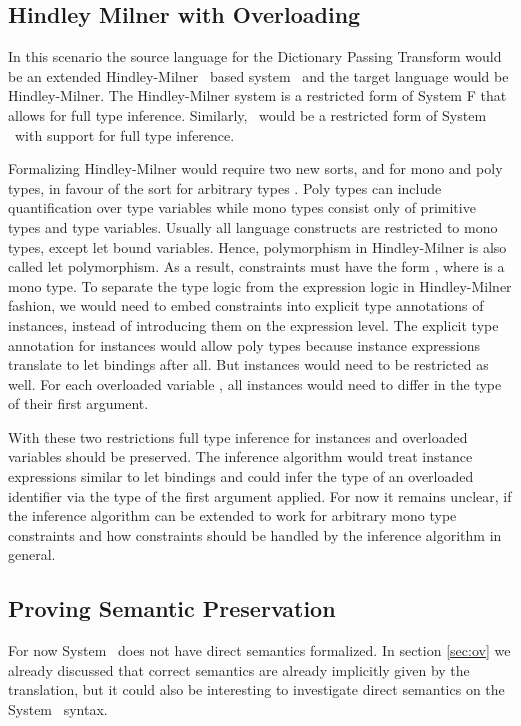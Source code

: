 \subsection{Hindley Milner with Overloading}\label{sec:hm}
In this scenario the source language for the Dictionary Passing Transform would be an extended Hindley-Milner~\cite{hm} based system \HMo\ and the target language would be Hindley-Milner. 
The Hindley-Milner system is a restricted form of System F that allows for full type inference. 
Similarly, \HMo\ would be a restricted form of System \Fo\ with support for full type inference. 

\noindent Formalizing Hindley-Milner would require two new sorts,  and  for mono and poly types, in favour of the sort for arbitrary types . 
Poly types can include quantification over type variables while mono types consist only of primitive types and type variables. 
Usually all language constructs are restricted to mono types, except let bound variables. 
Hence, polymorphism in Hindley-Milner is also called let polymorphism.  
As a result, constraints must have the form  \Constr{:} , where  is a mono type. 
To separate the type logic from the expression logic in Hindley-Milner fashion, we would need to embed constraints into explicit type annotations of instances, instead of introducing them on the expression level. 
The explicit type annotation for instances would allow poly types because instance expressions translate to let bindings after all.
But instances would need to be restricted as well. 
For each overloaded variable , all instances would need to differ in the type of their first argument.

\noindent With these two restrictions full type inference for instances and overloaded variables should be preserved.
The inference algorithm would treat instance expressions similar to let bindings and could infer the type of an overloaded identifier via the type of the first argument applied. 
For now it remains unclear, if the inference algorithm can be extended to work for arbitrary mono type constraints and how constraints should be handled by the inference algorithm in general.

\subsection{Proving Semantic Preservation}
For now System \Fo\ does not have direct semantics formalized. In section \ref{sec:ov} we already discussed that correct semantics are already implicitly given by the translation, but it could also be interesting to investigate direct semantics on the System \Fo\ syntax.


